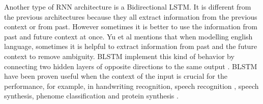 \documentclass[letterpaper, 12 pt, conference]{ieeeconf}  %
\begin{document}
Another type of RNN architecture is a Bidirectional LSTM. It is different from the previous architectures because they all extract information from the previous context or from past. However sometimes it is better to use the information from past and future context at once. Yu et al \cite{blstm_intro} mentions that when modelling english language, sometimes it is helpful to extract information from past and the future context to remove ambiguity. BLSTM implement this kind of behavior by connecting two hidden layers of opposite directions to the same output \cite{blstm_intro}. BLSTM have been proven useful when the context of the input is crucial for the performance, for example, in handwriting recognition, speech recognition \cite{bidirectional_lstm_speech}, speech synthesis, phenome classification and protein synthesis \cite{blstm_protein}.


\end{document}

